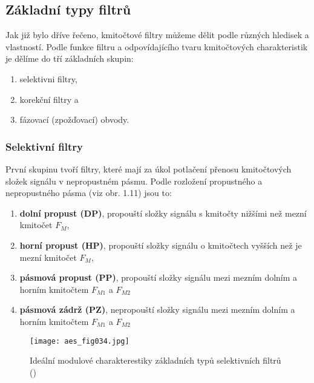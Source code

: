     \subsection{Základní typy filtrů}
      Jak již bylo dříve řečeno, kmitočtové filtry můžeme dělit podle různých hledisek a vlastností.
      Podle funkce filtru a odpovídajícího tvaru kmitočtových charakteristik je dělíme do tří
      základních skupin:
      \begin{enumerate}[leftmargin=0.5cm,rightmargin=1cm, label=\emph{\alph*}),noitemsep]
        \item selektivni filtry, 
        \item korekční filtry a 
        \item fázovací (zpožďovací) obvody.
      \end{enumerate}
         
      \subsubsection{Selektivní filtry}
        První skupinu tvoří filtry, které mají za úkol potlačení přenosu kmitočtových složek
        signálu v nepropustném pásmu. Podle rozložení propustného a nepropustného pásma (viz obr.
        1.11) jsou to:
        \begin{enumerate}[leftmargin=0.5cm,rightmargin=1cm, label=\emph{\alph*}),noitemsep]
          \item \textbf{dolní propust (DP)}, propouští složky signálu s kmitočty nižšími než mezní
                kmitočet \(F_M\), 
          \item \textbf{horní propust (HP)}, propouští složky signálu o kmitočtech vyšších než je
                mezní kmitočet \(F_M\), 
          \item \textbf{pásmová propust (PP)}, propouští složky signálu mezi mezním dolním a
                horním kmitočtem \(F_{M1}\) a \(F_{M2}\) 
          \item \textbf{pásmová zádrž (PZ)}, nepropouští složky signálu mezi mezním dolním a
                horním kmitočtem \(F_{M1}\) a \(F_{M2}\)    
        \end{enumerate}

        \begin{figure}[ht!]  %
          \centering
          \texttt{[image: aes\_fig034.jpg]}
          \caption{Ideální modulové charakterestiky základních typů selektivních filtrů
                    (\cite[s.~34]{HajekSedlacek2002})}
          \label{aes:fig034}    
        \end{figure}

